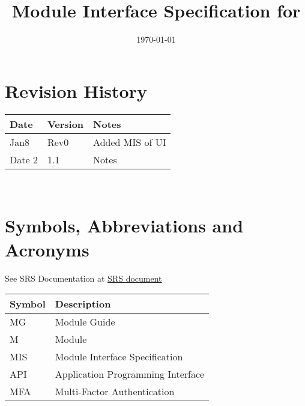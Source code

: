 \documentclass[12pt, titlepage]{article}
\begin{document}
\title{Module Interface Specification for \progname{}}

\author{\authname}

\date{\today}

\maketitle


\section{Revision History}

\begin{tabularx}{\textwidth}{p{3cm}p{2cm}X}
\toprule {\bf Date} & {\bf Version} & {\bf Notes}\\
\midrule
Jan8 & Rev0 & Added MIS of UI\\
Date 2 & 1.1 & Notes\\
\bottomrule
\end{tabularx}

~\newpage

\section{Symbols, Abbreviations and Acronyms}

See SRS Documentation at \href{https://github.com/Inreet-Kaur/capstone/blob/main/docs/SRS/SRS.pdf} {SRS document}

\begin{tabularx}{\textwidth}{p{2cm}X}
  \toprule
  {\bf Symbol} & {\bf Description}                                                                                     \\
  \midrule
  MG           & Module Guide                                                                                          \\
  M            & Module                                                                                                \\
  MIS          & Module Interface Specification                                                                        \\
  API          & Application Programming Interface                                                                     \\
  MFA          & Multi-Factor Authentication                                                                           \\
  \bottomrule
\end{tabularx}
\end{document}
